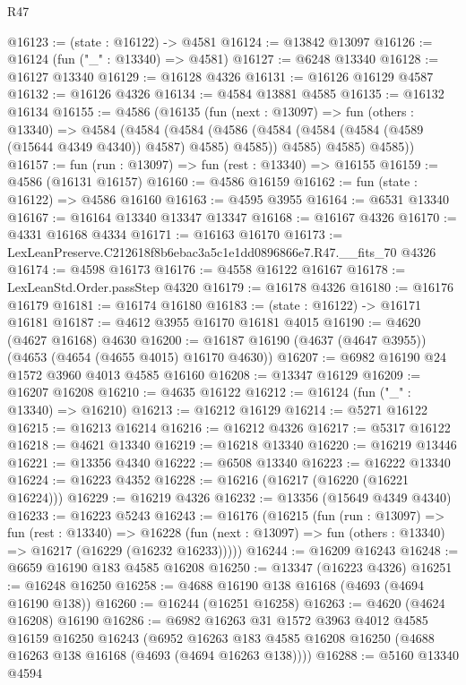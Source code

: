 \begin{lexlean}{R47}
\begin{coremodule}
@16123 := (state : @16122) -> @4581
@16124 := @13842 @13097
@16126 := @16124 (fun ("_" : @13340) => @4581)
@16127 := @6248 @13340
@16128 := @16127 @13340
@16129 := @16128 @4326
@16131 := @16126 @16129 @4587
@16132 := @16126 @4326
@16134 := @4584 @13881 @4585
@16135 := @16132 @16134
@16155 := @4586
    (@16135
      (fun (next : @13097) =>
      fun (others : @13340) =>
      @4584
        (@4584
          (@4584
            (@4586 (@4584 (@4584 (@4584 (@4589 (@15644 @4349 @4340)) @4587) @4585) @4585))
            @4585)
          @4585)
        @4585))
@16157 := fun (run : @13097) => fun (rest : @13340) => @16155
@16159 := @4586 (@16131 @16157)
@16160 := @4586 @16159
@16162 := fun (state : @16122) => @4586 @16160
@16163 := @4595 @3955
@16164 := @6531 @13340
@16167 := @16164 @13340 @13347 @13347
@16168 := @16167 @4326
@16170 := @4331 @16168 @4334
@16171 := @16163 @16170
@16173 := LexLeanPreserve.C212618f8b6ebac3a5c1e1dd0896866e7.R47.__fits_70 @4326
@16174 := @4598 @16173
@16176 := @4558 @16122 @16167
@16178 := LexLeanStd.Order.passStep @4320
@16179 := @16178 @4326
@16180 := @16176 @16179
@16181 := @16174 @16180
@16183 := (state : @16122) -> @16171 @16181
@16187 := @4612 @3955 @16170 @16181 @4015
@16190 := @4620 (@4627 @16168) @4630
@16200 := @16187 @16190 (@4637 (@4647 @3955)) (@4653 (@4654 (@4655 @4015) @16170 @4630))
@16207 := @6982 @16190 @24 @1572 @3960 @4013 @4585 @16160
@16208 := @13347 @16129
@16209 := @16207 @16208
@16210 := @4635 @16122
@16212 := @16124 (fun ("_" : @13340) => @16210)
@16213 := @16212 @16129
@16214 := @5271 @16122
@16215 := @16213 @16214
@16216 := @16212 @4326
@16217 := @5317 @16122
@16218 := @4621 @13340
@16219 := @16218 @13340
@16220 := @16219 @13446
@16221 := @13356 @4340
@16222 := @6508 @13340
@16223 := @16222 @13340
@16224 := @16223 @4352
@16228 := @16216 (@16217 (@16220 (@16221 @16224)))
@16229 := @16219 @4326
@16232 := @13356 (@15649 @4349 @4340)
@16233 := @16223 @5243
@16243 := @16176
    (@16215
      (fun (run : @13097) =>
      fun (rest : @13340) =>
      @16228 (fun (next : @13097) => fun (others : @13340) => @16217 (@16229 (@16232 @16233)))))
@16244 := @16209 @16243
@16248 := @6659 @16190 @183 @4585 @16208
@16250 := @13347 (@16223 @4326)
@16251 := @16248 @16250
@16258 := @4688 @16190 @138 @16168 (@4693 (@4694 @16190 @138))
@16260 := @16244 (@16251 @16258)
@16263 := @4620 (@4624 @16208) @16190
@16286 := @6982
    @16263
    @31
    @1572
    @3963
    @4012
    @4585
    @16159
    @16250
    @16243
    (@6952 @16263 @183 @4585 @16208 @16250 (@4688 @16263 @138 @16168 (@4693 (@4694 @16263 @138))))
@16288 := @5160 @13340 @4594

\end{coremodule}
\end{lexlean}
